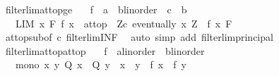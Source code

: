 \begin{isabellebody}
\endisatagproof
{\isafoldproof}%
%
\isadelimproof
\isanewline
%
\endisadelimproof
\isanewline
{}\isamarkupfalse%
\ filterlim{\isacharunderscore}{\kern0pt}at{\isacharunderscore}{\kern0pt}top{\isacharunderscore}{\kern0pt}ge{\isacharcolon}{\kern0pt}\isanewline
\ \ \ f\ {\isacharcolon}{\kern0pt}{\isacharcolon}{\kern0pt}\ {\isachardoublequoteopen}{\isacharprime}{\kern0pt}a\ {\isasymRightarrow}\ {\isacharparenleft}{\kern0pt}{\isacharprime}{\kern0pt}b{\isacharcolon}{\kern0pt}{\isacharcolon}{\kern0pt}linorder{\isacharparenright}{\kern0pt}{\isachardoublequoteclose}\ \ c\ {\isacharcolon}{\kern0pt}{\isacharcolon}{\kern0pt}\ {\isachardoublequoteopen}{\isacharprime}{\kern0pt}b{\isachardoublequoteclose}\isanewline
\ \ \ {\isachardoublequoteopen}{\isacharparenleft}{\kern0pt}LIM\ x\ F{\isachardot}{\kern0pt}\ f\ x\ {\isacharcolon}{\kern0pt}{\isachargreater}{\kern0pt}\ at{\isacharunderscore}{\kern0pt}top{\isacharparenright}{\kern0pt}\ {\isasymlongleftrightarrow}\ {\isacharparenleft}{\kern0pt}{\isasymforall}Z{\isasymge}c{\isachardot}{\kern0pt}\ eventually\ {\isacharparenleft}{\kern0pt}{\isasymlambda}x{\isachardot}{\kern0pt}\ Z\ {\isasymle}\ f\ x{\isacharparenright}{\kern0pt}\ F{\isacharparenright}{\kern0pt}{\isachardoublequoteclose}\isanewline
%
\isadelimproof
\ \ %
\endisadelimproof
%
\isatagproof
{}\isamarkupfalse%
\ at{\isacharunderscore}{\kern0pt}top{\isacharunderscore}{\kern0pt}sub{\isacharbrackleft}{\kern0pt}of\ c{\isacharbrackright}{\kern0pt}\ filterlim{\isacharunderscore}{\kern0pt}INF\ \isamarkupfalse%
\ {\isacharparenleft}{\kern0pt}auto\ simp\ add{\isacharcolon}{\kern0pt}\ filterlim{\isacharunderscore}{\kern0pt}principal{\isacharparenright}{\kern0pt}%
\endisatagproof
{\isafoldproof}%
%
\isadelimproof
\isanewline
%
\endisadelimproof
\isanewline
{}\isamarkupfalse%
\ filterlim{\isacharunderscore}{\kern0pt}at{\isacharunderscore}{\kern0pt}top{\isacharunderscore}{\kern0pt}at{\isacharunderscore}{\kern0pt}top{\isacharcolon}{\kern0pt}\isanewline
\ \ \ f\ {\isacharcolon}{\kern0pt}{\isacharcolon}{\kern0pt}\ {\isachardoublequoteopen}{\isacharprime}{\kern0pt}a{\isacharcolon}{\kern0pt}{\isacharcolon}{\kern0pt}linorder\ {\isasymRightarrow}\ {\isacharprime}{\kern0pt}b{\isacharcolon}{\kern0pt}{\isacharcolon}{\kern0pt}linorder{\isachardoublequoteclose}\isanewline
\ \ \ mono{\isacharcolon}{\kern0pt}\ {\isachardoublequoteopen}{\isasymAnd}x\ y{\isachardot}{\kern0pt}\ Q\ x\ {\isasymLongrightarrow}\ Q\ y\ {\isasymLongrightarrow}\ x\ {\isasymle}\ y\ {\isasymLongrightarrow}\ f\ x\ {\isasymle}\ f\ y{\isachardoublequoteclose}\isanewline

\end{isabellebody}
